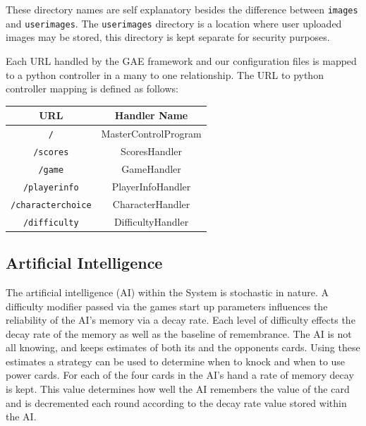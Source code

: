 \documentclass[12pt]{IEEEtran}
\begin{document}
	These directory names are self explanatory besides the difference between \texttt{images} and \texttt{userimages}. 			The \texttt{userimages} directory is a location where user uploaded images may be stored, this directory is kept 				separate for security purposes. 

	Each URL handled by the GAE framework and our configuration files is mapped to a python controller in a many to one 			relationship. The URL to python controller mapping is defined as follows:
	
	\begin{center}
		\begin{tabular}{| c | c |}\hline
			\multicolumn{1}{|c}{URL} & \multicolumn{1}{c|}{ Handler Name }\\\hline
			 \texttt{/}			& MasterControlProgram\\\hline
			 \texttt{/scores} 		& ScoresHandler\\\hline
			 \texttt{/game} 		& GameHandler\\\hline
			 \texttt{/playerinfo}	& PlayerInfoHandler\\\hline
			 \texttt{/characterchoice} & CharacterHandler\\\hline
			 \texttt{/difficulty}		& DifficultyHandler\\\hline
		\end{tabular}
	\end{center}

\subsection{Artificial Intelligence}
\label{subsec:ai}

	The artificial intelligence (AI) within the System is stochastic in nature. A difficulty modifier passed via the games start up 	parameters influences the reliability of the AI's memory via a decay rate. Each level of difficulty effects the decay rate 			of the memory as well as the baseline of remembrance. The AI is not all knowing, and keeps estimates of both its and 			the opponents cards. Using these estimates a strategy can 	be used to determine when to knock and when to use 			power cards. For each of the four cards in the AI's hand a rate of memory decay is kept. This value determines how well 	the AI remembers the value of the card and is decremented each round according to the decay rate value 				stored within the AI.
\end{document}
